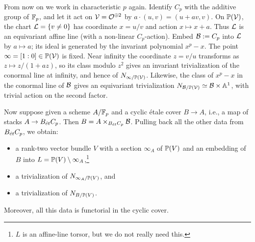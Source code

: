 \documentclass{amsart}
\numberwithin{proposition}{section}
\numberwithin{equation}{section}
\begin{document}
From now on we work in characteristic $p$ again.
Identify $C_p$ with the additive group of $\F_p$, and let it act on $\scr V=\scr O^{\oplus 2}$ by $a\cdot(u,v)=(u+av,v)$.
On $\P(\scr V)$, the chart $\scr L=\{v\ne0\}$ has coordinate $x=u/v$ and action $x\mapsto x+a$.
Thus $\scr L$ is an equivariant affine line (with a non-linear $C_p$-action).
Embed $\scr B:=C_p$ into $\scr L$ by $a\mapsto a$; its ideal is generated by the invariant polynomial $x^p-x$.
The point $\infty=[1:0] \in \P(\scr V)$ is fixed.
Near infinity the coordinate $z=v/u$ transforms as $z\mapsto z/(1+az)$, so its class modulo $z^2$ gives an invariant trivialization of the conormal line at infinity, and hence of $N_{\infty/\P(\scr V)}$.
Likewise, the class of $x^p-x$ in the conormal line of $\scr B$ gives an equivariant trivialization $N_{\scr B/\P(\scr V)}\simeq\scr B\times\A^1$, with trivial action on the second factor.

Now suppose given a scheme $A/\F_p$ and a cyclic étale cover $B \to A$, i.e., a map of stacks $A \to B_\et C_p$.
Then $B = A \times_{B_\et C_p} \scr B$.
Pulling back all the other data from $B_\et C_p$, we obtain:
\begin{itemize}
\item a rank-two vector bundle $V$ with a section $\infty_A$ of $\P(V)$ and an embedding of $B$ into $L=\P(V)\setminus\infty_A$,\footnote{$L$ is an affine-line torsor, but we do not really need this.}
\item a trivialization of $N_{\infty_A/\P(V)}$, and
\item a trivialization of $N_{B/\P(V)}$.
\end{itemize}
Moreover, all this data is functorial in the cyclic cover.
\end{document}
